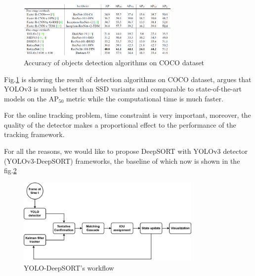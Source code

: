 \begin{figure}[h!]
    \centering
    \includegraphics[width=0.7\textwidth]{Chapters/Fig/yolov3_acc_com.png}
    \caption{Accuracy of objects detection algorithms on COCO dataset}
    \label{fig:yolov3_acc_com}
\end{figure}
Fig.\ref{fig:yolov3_acc_com} is showing the result of detection algorithms on COCO dataset,
\cite{yolov3} argues that YOLOv3 is much better than SSD variants and comparable to state-of-the-art
models on the $\text{AP}_{50}$ metric while the computational time is much faster.\par
For the online tracking problem, time constraint is very important, moreover, the quality of the detector makes a proportional effect to the performance of the tracking framework.\par
For all the reasons, we would like to propose DeepSORT with YOLOv3 detector (YOLOv3-DeepSORT) frameworks, the baseline of which now is shown in the fig.\ref{fig:yolo_deepsort} 
\begin{figure}[h!]
    \centering
    \includegraphics[width=0.8\textwidth]{Chapters/Fig/Thesis_diagram-yolo_deepsort.png}
    \caption{YOLO-DeepSORT's workflow}
    \label{fig:yolo_deepsort}
\end{figure}

